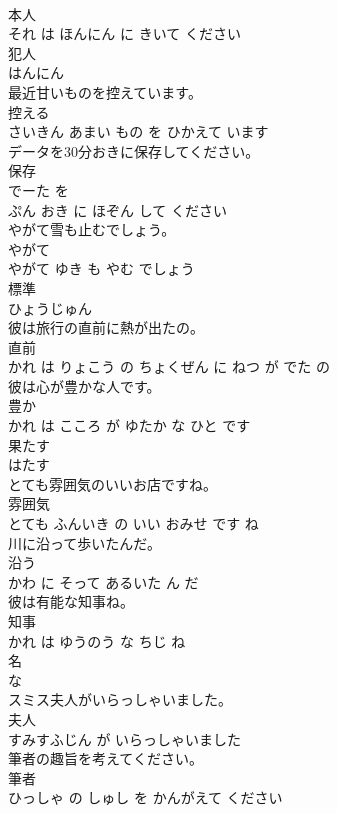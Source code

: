 \documentclass[8pt]{extreport}
\begin{document}
\begin{CJK}{UTF8}{min}
\\	本人 
\\	それ は ほんにん に きいて ください			
\\	犯人	
\\	はんにん		
\\	最近甘いものを控えています。	
\\	控える 
\\	さいきん あまい もの を ひかえて います			
\\	データを30分おきに保存してください。	
\\	保存 
\\	でーた を 
\\	ぷん おき に ほぞん して ください			
\\	やがて雪も止むでしょう。	
\\	やがて 
\\	やがて ゆき も やむ でしょう			
\\	標準	
\\	ひょうじゅん		
\\	彼は旅行の直前に熱が出たの。	
\\	直前 
\\	かれ は りょこう の ちょくぜん に ねつ が でた の			
\\	彼は心が豊かな人です。	
\\	豊か 
\\	かれ は こころ が ゆたか な ひと です			
\\	果たす	
\\	はたす		
\\	とても雰囲気のいいお店ですね。	
\\	雰囲気 
\\	とても ふんいき の いい おみせ です ね			
\\	川に沿って歩いたんだ。	
\\	沿う 
\\	かわ に そって あるいた ん だ			
\\	彼は有能な知事ね。	
\\	知事 
\\	かれ は ゆうのう な ちじ ね			
\\	名	
\\	な		
\\	スミス夫人がいらっしゃいました。	
\\	夫人 
\\	すみすふじん が いらっしゃいました			
\\	筆者の趣旨を考えてください。	
\\	筆者 
\\	ひっしゃ の しゅし を かんがえて ください			

\end{CJK}
\end{document}
